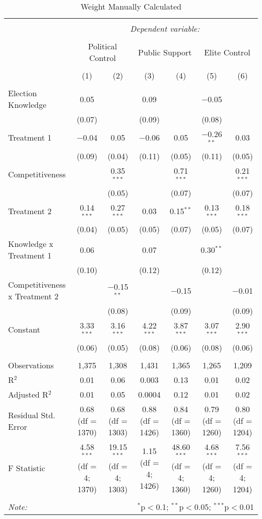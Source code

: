 
\begin{table}[!htbp] \centering 
  \caption{Weight Manually Calculated} 
  \label{} 
\small 
\begin{tabular}{@{\extracolsep{3pt}}lcccccc} 
\\[-1.8ex]\hline 
\hline \\[-1.8ex] 
 & \multicolumn{6}{c}{\textit{Dependent variable:}} \\ 
\cline{2-7} 
\\[-1.8ex] & \multicolumn{2}{c}{Political Control} & \multicolumn{2}{c}{Public Support} & \multicolumn{2}{c}{Elite Control} \\ 
\\[-1.8ex] & (1) & (2) & (3) & (4) & (5) & (6)\\ 
\hline \\[-1.8ex] 
 Election Knowledge & 0.05 &  & 0.09 &  & $-$0.05 &  \\ 
  & (0.07) &  & (0.09) &  & (0.08) &  \\ 
  Treatment 1 & $-$0.04 & 0.05 & $-$0.06 & 0.05 & $-$0.26$^{**}$ & 0.03 \\ 
  & (0.09) & (0.04) & (0.11) & (0.05) & (0.11) & (0.05) \\ 
  Competitiveness &  & 0.35$^{***}$ &  & 0.71$^{***}$ &  & 0.21$^{***}$ \\ 
  &  & (0.05) &  & (0.07) &  & (0.07) \\ 
  Treatment 2 & 0.14$^{***}$ & 0.27$^{***}$ & 0.03 & 0.15$^{**}$ & 0.13$^{***}$ & 0.18$^{***}$ \\ 
  & (0.04) & (0.05) & (0.05) & (0.07) & (0.05) & (0.07) \\ 
  Knowledge x Treatment 1 & 0.06 &  & 0.07 &  & 0.30$^{**}$ &  \\ 
  & (0.10) &  & (0.12) &  & (0.12) &  \\ 
  Competitiveness x Treatment 2 &  & $-$0.15$^{**}$ &  & $-$0.15 &  & $-$0.01 \\ 
  &  & (0.08) &  & (0.09) &  & (0.09) \\ 
  Constant & 3.33$^{***}$ & 3.16$^{***}$ & 4.22$^{***}$ & 3.87$^{***}$ & 3.07$^{***}$ & 2.90$^{***}$ \\ 
  & (0.06) & (0.05) & (0.08) & (0.06) & (0.08) & (0.06) \\ 
 \hline \\[-1.8ex] 
Observations & 1,375 & 1,308 & 1,431 & 1,365 & 1,265 & 1,209 \\ 
R$^{2}$ & 0.01 & 0.06 & 0.003 & 0.13 & 0.01 & 0.02 \\ 
Adjusted R$^{2}$ & 0.01 & 0.05 & 0.0004 & 0.12 & 0.01 & 0.02 \\ 
Residual Std. Error & 0.68 (df = 1370) & 0.68 (df = 1303) & 0.88 (df = 1426) & 0.84 (df = 1360) & 0.79 (df = 1260) & 0.80 (df = 1204) \\ 
F Statistic & 4.58$^{***}$ (df = 4; 1370) & 19.15$^{***}$ (df = 4; 1303) & 1.15 (df = 4; 1426) & 48.60$^{***}$ (df = 4; 1360) & 4.68$^{***}$ (df = 4; 1260) & 7.56$^{***}$ (df = 4; 1204) \\ 
\hline 
\hline \\[-1.8ex] 
\textit{Note:}  & \multicolumn{6}{r}{$^{*}$p$<$0.1; $^{**}$p$<$0.05; $^{***}$p$<$0.01} \\ 
\end{tabular} 
\end{table} 
